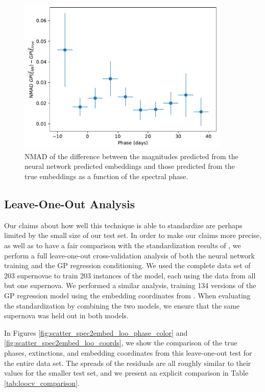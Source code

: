 \begin{figure}[htbp]
    \centering
    \includegraphics[width=0.9\textwidth]{figures/nn_twins/stand_err_vs_phase_nn.pdf}
    \caption{NMAD of the difference between the magnitudes predicted from the neural network predicted embeddings and those predicted from the true embeddings as a function of the spectral phase.}
    \label{fig:stand_err_vs_phase}
\end{figure}

\subsection{Leave-One-Out Analysis}
Our claims about how well this technique is able to standardize \sne are perhaps limited by the small size of our test set. In order to make our claims more precise, as well as to have a fair comparison with the standardization results of , we perform a full leave-one-out cross-validation analysis of both the neural network training and the GP regression conditioning. We used the complete data set of 203 supernovae to train 203 instances of the \stoe{} model, each using the data from all but one supernova. We performed a similar analysis, training 134 versions of the GP regression model using the embedding coordinates from . When evaluating the standardization by combining the two models, we ensure that the same supernova was held out in both models.

In Figures \ref{fig:scatter_spec2embed_loo_phase_color} and \ref{fig:scatter_spec2embed_loo_coords}, we show the comparison of the true phases, extinctions, and embedding coordinates from this leave-one-out test for the entire data set. The spreads of the residuals are all roughly similar to their values for the smaller test set, and we present an explicit comparison in Table \ref{tab:loocv_comparison}.

